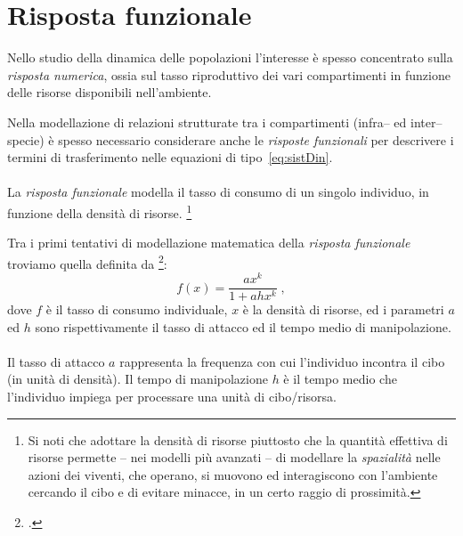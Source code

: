 \section{Risposta funzionale}
\label{sec:rispFunz}
Nello studio della dinamica delle popolazioni l'interesse è spesso concentrato sulla \emph{risposta numerica}, ossia
sul tasso riproduttivo dei vari compartimenti in funzione delle risorse disponibili nell'ambiente.

Nella modellazione di relazioni strutturate tra i compartimenti (infra-- ed inter-- specie) è spesso necessario
considerare anche le \emph{risposte funzionali} per descrivere i termini di trasferimento
nelle equazioni di tipo~\eqref{eq:sistDin}.

\paragraph{}
La \emph{risposta funzionale} modella il tasso di consumo di un singolo individuo, in funzione della densità di risorse.
\footnote{Si noti che adottare la densità di risorse piuttosto che la quantità effettiva di risorse permette --
nei modelli più avanzati -- di modellare la \emph{spazialità} nelle azioni dei viventi, che operano, si muovono
ed interagiscono con l'ambiente cercando il cibo e di evitare minacce, in un certo raggio di prossimità.}

Tra i primi tentativi di modellazione matematica della \emph{risposta funzionale} troviamo quella definita da
\citeauthor{holling59}\footcite{holling59}:
\begin{equation}
    f(x) = \frac{a x^k}{1+ a h x^k} \; ,
    \label{eq:holling}
\end{equation}
dove $f$ è il tasso di consumo individuale, $x$ è la densità di risorse, ed i parametri $a$ ed $h$ sono rispettivamente
il tasso di attacco ed il tempo medio di manipolazione.

\paragraph{}
Il tasso di attacco $a$ rappresenta la frequenza con cui l'individuo incontra il cibo (in unità di densità).
Il tempo di manipolazione $h$ è il tempo medio che l'individuo impiega per processare una unità di cibo/risorsa.


